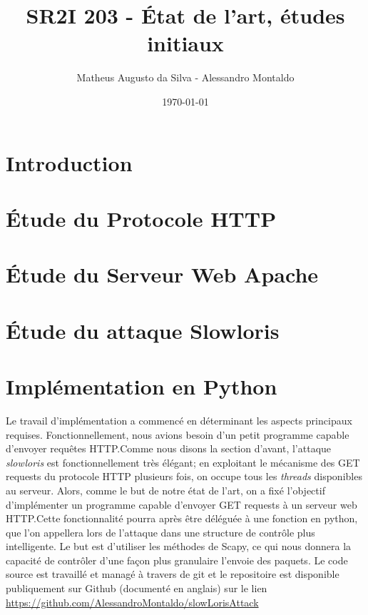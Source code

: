 \documentclass{article}
\author{Matheus Augusto da Silva - Alessandro Montaldo}
\title{\textbf{SR2I 203 - État de l'art, études initiaux}}
\date{\today}
\begin{document}
\maketitle

\section{Introduction}

\section{Étude du Protocole HTTP}

\section{Étude du Serveur Web Apache}

\section{Étude du attaque Slowloris}

\section{Implémentation en Python}
Le travail d'implémentation a commencé en déterminant les aspects principaux requises. Fonctionnellement, nous avions
besoin d'un petit programme capable d’envoyer requêtes HTTP.Comme nous disons la section d'avant,
l'attaque \textit{slowloris} est fonctionnellement très élégant; en exploitant le mécanisme des GET
requests du protocole HTTP plusieurs fois, on occupe tous les \textit{threads} disponibles au serveur.
Alors, comme le but de notre état de l'art, on a fixé l'objectif d’implémenter un programme capable d'envoyer
GET requests à un serveur web HTTP.Cette fonctionnalité pourra après être déléguée à une fonction en python,
que l'on appellera lors de l'attaque dans une structure de contrôle plus intelligente.
Le but est d'utiliser les méthodes de Scapy, ce qui nous donnera la capacité de contrôler d'une façon plus granulaire
l'envoie des paquets. Le code source est travaillé et managé à travers de
git et le repositoire est disponible publiquement sur Github (documenté en anglais) sur le lien \href{https://github.com/AlessandroMontaldo/slowLorisAttack}{https://github.com/AlessandroMontaldo/slowLorisAttack}
\end{document}
